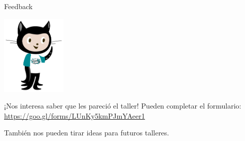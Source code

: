 \begin{frame}{Feedback}

    \begin{center}
        \includegraphics[height=1.5in]{images/octocat-comcom.pdf}
    \end{center}

    \begin{block}{¡Nos interesa saber que les pareció el taller!}
        Pueden completar el formulario: \url{https://goo.gl/forms/LUnKy5kmPJmYAeer1}

        \vspace{0.5em}

        También nos pueden tirar ideas para futuros talleres.
    \end{block}

\end{frame}

